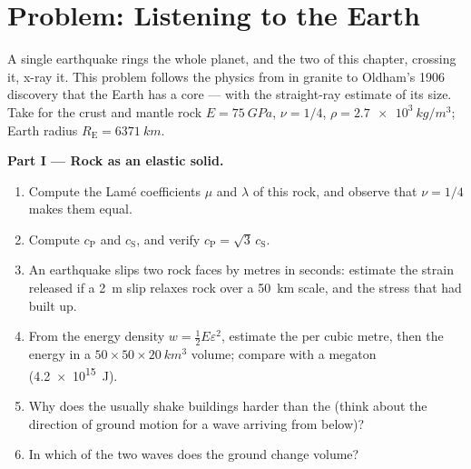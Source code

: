 \section{Problem: Listening to the Earth}

\begin{problem}\label{pb:b3:continuum-elasticity:1}
A single earthquake rings the whole planet, and the two 
of this chapter, crossing it, x-ray it. This problem follows the
physics from  in granite to Oldham's 1906 discovery that
the Earth has a core --- with the straight-ray estimate of its size.
Take for the crust and mantle rock $E = \qty{75}{GPa}$, $\nu = 1/4$,
$\rho = \qty{2.7e3}{kg/m^3}$; Earth radius $R_{\text{E}} =
\qty{6371}{km}$.

\medskip\noindent\textbf{Part I --- Rock as an elastic solid.}
\begin{enumerate}
  \item Compute the Lamé coefficients $\mu$ and $\lambda$ of this
        rock, and observe that $\nu = 1/4$ makes them equal.
  \item Compute $c_{\text{P}}$ and $c_{\text{S}}$, and verify
        $c_{\text{P}} = \sqrt3\,c_{\text{S}}$.
  \item An earthquake slips two rock faces by metres in seconds:
        estimate the strain released if a \qty{2}{m} slip relaxes rock
        over a \qty{50}{km} scale, and the stress that had built up.
  \item From the energy density $w = \tfrac12 E\varepsilon^2$,
        estimate the  per cubic metre, then the energy
        in a $50 \times 50 \times \qty{20}{km^3}$ volume; compare
        with a megaton (\qty{4.2e15}{J}).
  \item Why does the  usually shake buildings harder than the  (think about the direction of ground motion for a wave
        arriving from below)?
  \item In which of the two waves does the ground change volume?
\end{enumerate}


\end{problem}
